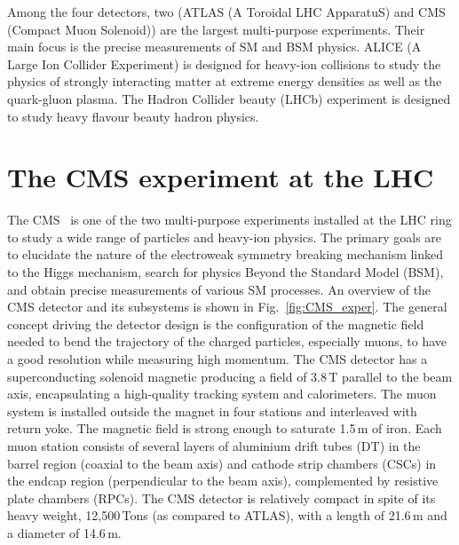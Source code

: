 Among the four detectors, two (ATLAS (A Toroidal LHC ApparatuS) and CMS (Compact Muon Solenoid)) are the largest multi-purpose experiments. Their main focus is the precise measurements of SM and BSM physics. ALICE (A Large Ion Collider Experiment) is designed for heavy-ion collisions to study the physics of strongly interacting matter at extreme energy densities as well as the quark-gluon plasma. The Hadron Collider beauty (LHCb) experiment is designed to study heavy flavour beauty hadron physics.

\section{The CMS experiment at the LHC}\label{sec:cms}
The CMS~\cite{cms_exp} is one of the two multi-purpose experiments installed at the LHC ring to study a wide range of particles and heavy-ion physics. The primary goals are to elucidate the nature of the electroweak symmetry breaking mechanism linked to the Higgs mechanism, search for physics Beyond the Standard Model (BSM), and obtain precise measurements of various SM processes. An overview of the CMS detector and its subsystems is shown in Fig.~\ref{fig:CMS_exper}. The general concept driving the detector design is the configuration of the magnetic field needed to bend the trajectory of the charged particles, especially muons, to have a good resolution while measuring high momentum. The CMS detector has a superconducting solenoid magnetic producing a field of 3.8\,T parallel to the beam axis, encapsulating a high-quality tracking system and calorimeters. The muon system is installed outside the magnet in four stations and interleaved with return yoke. The magnetic field is strong enough to saturate 1.5\,m of iron. Each muon station consists of several layers of aluminium drift tubes (DT) in the barrel region (coaxial to the beam axis) and cathode strip chambers (CSCs) in the endcap region (perpendicular to the beam axis), complemented by resistive plate chambers (RPCs). The CMS detector is relatively compact in spite of its heavy weight, 12,500\,Tons (as compared to ATLAS), with a length of 21.6\,m and a diameter of 14.6\,m.  

